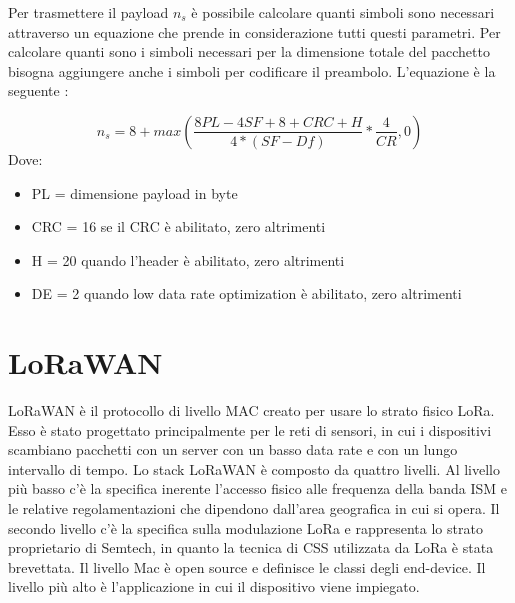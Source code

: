 \documentclass[12pt,a4paper,openright,twoside]{report}
\begin{document}
Per trasmettere il payload $n_s$ \`e possibile calcolare quanti simboli sono necessari attraverso un equazione che prende in considerazione tutti questi parametri. Per calcolare quanti sono i simboli necessari per la dimensione totale del pacchetto bisogna aggiungere anche i simboli per codificare il preambolo. L'equazione  \`e la seguente :

\begin{equation*} n_s = 8 + max (\frac{8PL-4SF+8+CRC+H}{4 * (SF-Df)} * \frac{4}{CR},0) \end{equation*}
Dove:
\begin{itemize}                       
\item PL = dimensione payload in byte
\item CRC = 16 se il CRC \`e abilitato, zero altrimenti
\item H = 20 quando l'header \`e abilitato, zero altrimenti
\item DE = 2 quando low data rate optimization \`e abilitato, zero altrimenti
\end{itemize}


\section{LoRaWAN}
LoRaWAN \`e il protocollo di livello MAC creato per usare lo strato fisico LoRa. Esso \`e stato progettato principalmente per le reti di sensori, in cui i dispositivi scambiano pacchetti con un server con un basso data rate e con un lungo intervallo di tempo. 
Lo stack LoRaWAN \`e composto da quattro livelli. Al livello pi\`u basso c'\`e la specifica inerente l'accesso fisico alle frequenza della banda ISM e le relative regolamentazioni che dipendono dall'area geografica in cui si opera. Il secondo livello c'\`e la specifica sulla modulazione LoRa e rappresenta lo strato proprietario di Semtech, in quanto la tecnica di CSS utilizzata da LoRa \`e stata brevettata. Il livello Mac \`e open source e definisce le classi degli end-device. Il livello pi\`u alto \`e l'applicazione in cui il dispositivo viene impiegato.
\end{document}
